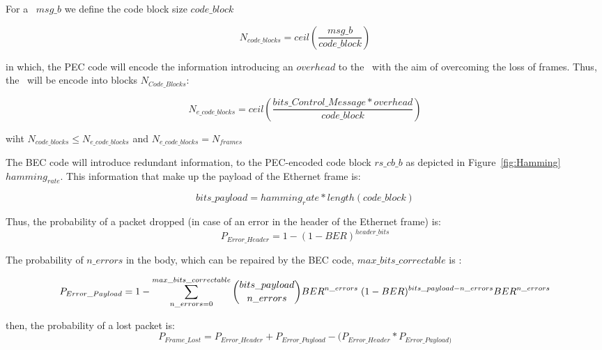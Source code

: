 For a \ControlMessage\ $msg\_b$ we define the code block size $code\_block$

\begin{equation}
N_{code\_blocks} = ceil(\frac{msg\_b}{code\_block})
\end{equation}

in which, the PEC code will encode the information introducing an $overhead$
to the \ControlMessage\ with the aim of overcoming the loss of frames. Thus, the
\ControlMessage\ will be encode into blocks $N_{Code\_Blocks}$:

\begin{equation}
N_{e\_code\_blocks} = ceil(\frac{bits\_Control\_Message *overhead}{code\_block})
\end{equation}

wiht $N_{code\_blocks} \leq N_{e\_code\_blocks}$ and $ N_{e\_code\_blocks} =
N_{frames}$

\vspace{0.3 cm}

The BEC code will introduce redundant information, to the PEC-encoded code block
$rs\_cb\_b$ as depicted in Figure~\ref{fig:Hamming} $hamming_{rate}$.
This information that make up the payload of the Ethernet frame is:

\begin{equation}
bits\_payload = hamming_rate * length(code\_block)
\end{equation}

Thus, the probability of a packet dropped (in case of an error in the header of
the Ethernet frame) is:
\begin{equation}
P_{Error\_Header} = 1 - (1-BER)^{header\_bits}
\end{equation}

The probability of $n\_errors$ in the body, which can be repaired by the
BEC code, $max\_bits\_correctable$ is :

\begin{equation}
\footnotesize
P_{Error\_Payload} = 1 - \sum\limits_{n\_errors=0}^{max\_bits\_correctable}
\binom{bits\_payload} {n\_errors} BER^{n\_errors} \ (1-BER)^{bits\_payload -
n\_errors} BER^{n\_errors} \\
\end{equation}

then, the probability of a lost packet is:
\begin{equation}
P_{Frame\_Lost} = P_{Error\_Header} + P_{Error\_Payload} - (P_{Error\_Header} *
P_{Error\_Payload)}
\end{equation}

